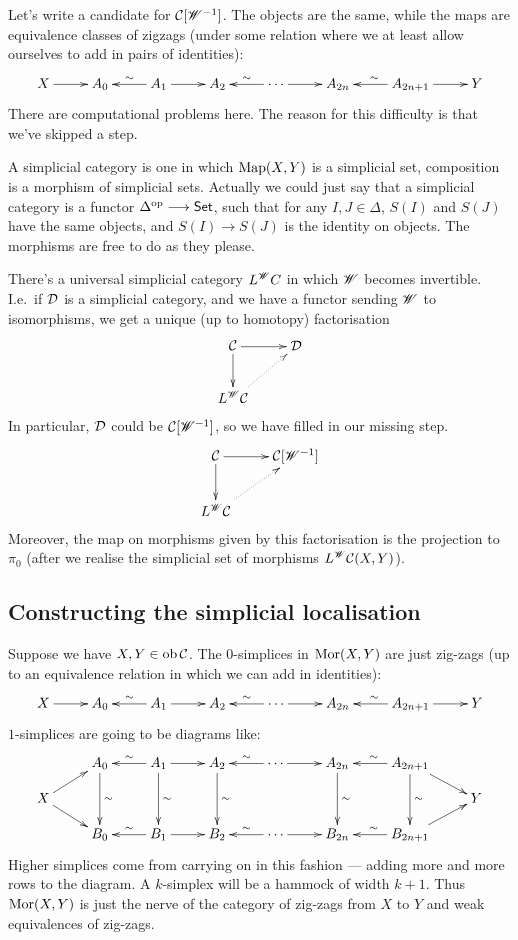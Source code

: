 \begin{SaulSimplicialLocalisation}
Let's write a candidate for $\mathcal{C}[\mathscr{W}^{-1}]$. The objects are the same, while the maps are equivalence classes of zigzags ({under some relation} where we at least allow ourselves to add in pairs of identities):
\[\xymatrix{
X\ar[r]&A_0&\ar[l]_\sim A_1\ar[r]&A_2&\ar[l]_\sim\cdots\ar[r]&A_{2n}&A_{2n+1}\ar[l]_\sim\ar[r]&Y
}\]
There are computational problems here. The reason for this difficulty is that we've skipped a step.
\begin{defn*}
A simplicial category is one in which $\operatorname{Map}(X,Y)$ is a simplicial set, composition is a morphism of simplicial sets. Actually we could just say that a simplicial category is a functor $\Delta^{\textup{op}}\longrightarrow\operatorname{{\mathsf{Set}}}$, such that for any $I,J\in\Delta$, $S(I)$ and $S(J)$ have the same objects, and $S(I)\to S(J)$ is the identity on objects. The morphisms are free to do as they please.
\end{defn*}
There's a universal simplicial category $L^{\mathscr{W}} C$ in which $\mathscr{W}$ becomes invertible. I.e.\ if $\mathcal{D}$ is a simplicial category, and we have a functor sending $\mathscr{W}$ to isomorphisms, we get a unique (up to homotopy) factorisation
\[\xymatrix{
\ar[d]\calC\ar[r]&\calD\\
L^\scrW \calC\ar@{..>}[ur]
}\]
In particular, $\mathcal{D}$ could be $\mathcal{C}[\mathscr{W}^{-1}]$, so we have filled in our missing step.
\[\xymatrix{
\ar[d]\calC\ar[r]&\calC[\scrW^{-1}]\\
L^\scrW \calC\ar@{..>}[ur]
}\]
Moreover, the map on morphisms given by this factorisation is the projection to $\pi_0$ (after we realise the simplicial set of morphisms $L^{\mathscr{W}} \mathcal{C}(X,Y)$).
\subsection*{Constructing the simplicial localisation}
Suppose we have $X,Y\in\textup{ob}\,\mathcal{C}$. The $0$-simplices in $\operatorname{Mor}(X,Y)$ are just zig-zags (up to an equivalence relation in which we can add in identities):
\[\xymatrix{
X\ar[r]&A_0&\ar[l]_\sim A_1\ar[r]&A_2&\ar[l]_\sim\cdots\ar[r]&A_{2n}&A_{2n+1}\ar[l]_\sim\ar[r]&Y
}\]
$1$-simplices are going to be diagrams like:
\[\xymatrix@R=.4cm{
&A_0\ar[dd]^\sim&\ar[l]_\sim A_1\ar[dd]^\sim\ar[r]&A_2\ar[dd]^\sim&\ar[l]_\sim\cdots\ar[r]&A_{2n}\ar[dd]^\sim &A_{2n+1}\ar[dd]^\sim\ar[l]_\sim\ar[rd]\\
X\ar[rd]\ar[ur]&&&&&&&Y\\
&B_0&\ar[l]_\sim B_1\ar[r]&B_2&\ar[l]_\sim\cdots\ar[r]&B_{2n}&B_{2n+1}\ar[l]_\sim\ar[ru]
}\]
Higher simplices come from carrying on in this fashion --- adding more and more rows to the diagram. A $k$-simplex will be a hammock of width $k+1$.
Thus $\operatorname{Mor}(X,Y)$ is just the nerve of the category of zig-zags from $X$ to $Y$ and weak equivalences of zig-zags.


\end{SaulSimplicialLocalisation}
